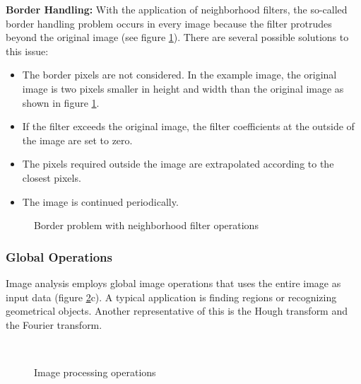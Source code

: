 \textbf{Border Handling:}
With the application of neighborhood filters, the so-called border handling
problem occurs in every image because the filter protrudes beyond the original
image (see figure \ref{fig:image_handling}). There are several possible solutions to this issue:

\begin{itemize}
\item The border pixels are not considered. In the example image, the original image 
is two pixels smaller in height and width than the original image as shown in
figure \ref{fig:image_handling}.
\item If the filter exceeds the original image, the filter coefficients
at the outside of the image are set to zero.
\item The pixels required outside the image are extrapolated according to the closest pixels.
\item The image is continued periodically.
\end{itemize}
    
\begin{figure}[b]
    \centering
    \begin{adjustbox}{max width=0.7\textwidth}
        
    \end{adjustbox}
    \caption{Border problem with neighborhood filter operations}
    \label{fig:image_handling}
\end{figure}


\subsubsection*{Global Operations}
Image analysis employs global image operations that uses the entire image as
input data (figure \ref{fig:image_operation}c). A typical application is finding
regions or recognizing geometrical objects. Another representative of this is
the Hough transform and the Fourier transform.

\begin{figure}[t!]%
    \centering
    \qquad
    \\
    \caption{Image processing operations}%
    \label{fig:image_operation}%
\end{figure}

